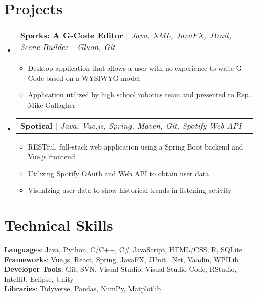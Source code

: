 \documentclass[letterpaper,11pt]{article}
\makeatletter
\newcommand{\resumeItem}[1]{
  \item\small{
    {#1 \vspace{-2pt}}
  }
}
\newcommand{\resumeProjectHeading}[2]{
    \item
    \begin{tabular*}{0.97\textwidth}{l@{\extracolsep{\fill}}r}
      \small#1 & #2 \\
    \end{tabular*}\vspace{-7pt}
}
\newcommand{\resumeSubHeadingListStart}{\begin{itemize}[leftmargin=0.15in, label={}]}
\newcommand{\resumeSubHeadingListEnd}{\end{itemize}}
\newcommand{\resumeItemListStart}{\begin{itemize}}
\newcommand{\resumeItemListEnd}{\end{itemize}\vspace{-5pt}}
\makeatother
\begin{document}
\section{{Projects}}
    \resumeSubHeadingListStart
      \resumeProjectHeading
          {\textbf{Sparks: A G-Code Editor} $|$ \emph{Java, XML, JavaFX, JUnit, Scene Builder - Gluon, Git}}{}
          \resumeItemListStart
            \resumeItem{Desktop application that allows a user with no experience to write G-Code based on a WYSIWYG model}
            \resumeItem{Application utilized by high school robotics team and presented to Rep. Mike Gallagher}
          \resumeItemListEnd
      \resumeProjectHeading
          {\textbf{Spotical} $|$ \emph{Java, Vue.js, Spring, Maven, Git, Spotify Web API}}{}
          \resumeItemListStart
            \resumeItem{RESTful, full-stack web application using a Spring Boot backend and Vue.js frontend}
            \resumeItem{Utilizing Spotify OAuth and Web API to obtain user data}
            \resumeItem{Visualzing user data to show historical trends in listening activity}
          \resumeItemListEnd
    \resumeSubHeadingListEnd
%
\section{Technical Skills}
 \begin{itemize}[leftmargin=0.15in, label={}]
    \small{
    \item{
     \textbf{Languages}{: Java, Python, C/C++, C\# JavaScript, HTML/CSS, R, SQLite} \\
     \textbf{Frameworks}{: Vue.js, React, Spring, JavaFX, JUnit, .Net, Vaadin, WPILib} \\
     \textbf{Developer Tools}{: Git, SVN, Visual Studio, Visual Studio Code, RStudio, IntelliJ, Eclipse, Unity} \\
     \textbf{Libraries}{: Tidyverse, Pandas, NumPy, Matplotlib}
    }}
 \end{itemize}


\end{document}
